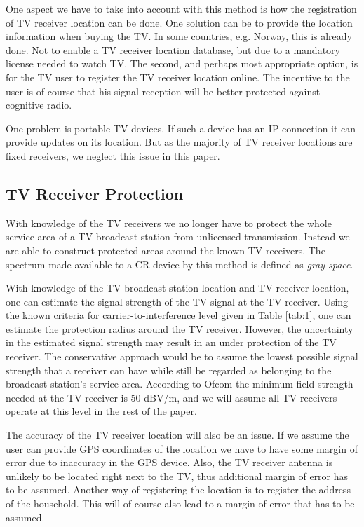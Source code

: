 \documentclass[journal,11pt,draftclsnofoot,onecolumn]{IEEEtran}
\begin{document}
One aspect we have to take into account with this method is how the registration of TV receiver location can be done. One solution can be to provide the location information when buying the TV. In some countries, e.g. Norway, this is already done. Not to enable a TV receiver location database, but due to a mandatory license needed to watch TV. The second, and perhaps most appropriate option, is for the TV user to register the TV receiver location online. The incentive to the user is of course that his signal reception will be better protected against cognitive radio.

One problem is portable TV devices. If such a device has an IP connection it can provide updates on its location. But as the majority of TV receiver locations are fixed receivers, we neglect this issue in this paper.

\subsection{TV Receiver Protection}
With knowledge of the TV receivers we no longer have to protect the whole service area of a TV broadcast station from unlicensed transmission. Instead we are able to construct protected areas around the known TV receivers. The spectrum made available to a CR device by this method is defined as \textit{gray space}.

With knowledge of the TV broadcast station location and TV receiver location, one can estimate the signal strength of the TV signal at the TV receiver. Using the known criteria for carrier-to-interference level given in Table \ref{tab:1}, one can estimate the protection radius around the TV receiver. However, the uncertainty in the estimated signal strength may result in an under protection of the TV receiver. The conservative approach would be to assume the lowest possible signal strength that a receiver can have while still be regarded as belonging to the broadcast station's service area. According to Ofcom the minimum field strength needed at the TV receiver is 50 dBV/m, and we will assume all TV receivers operate at this level in the rest of the paper.

The accuracy of the TV receiver location will also be an issue. If we assume the user can provide GPS coordinates of the location we have to have some margin of error due to inaccuracy in the GPS device. Also, the TV receiver antenna is unlikely to be located right next to the TV, thus additional margin of error has to be assumed. Another way of registering the location is to register the address of the household. This will of course also lead to a margin of error that has to be assumed.
\end{document}
